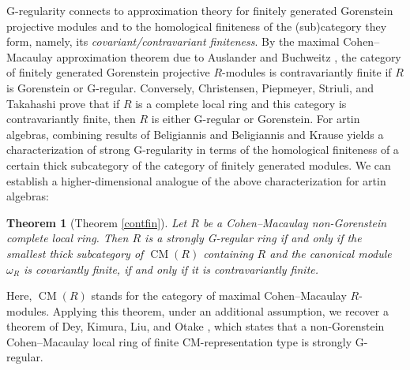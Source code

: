\documentclass{amsart}
\newtheorem{thm}{Theorem}[section]
\theoremstyle{definition}
\theoremstyle{remark}
\numberwithin{equation}{thm}
\def\cm{\operatorname{CM}}
\begin{document}
G-regularity connects to approximation theory for finitely generated Gorenstein projective modules and to the homological finiteness of the (sub)category they form, namely, its {\em covariant/contravariant finiteness}. 
By the maximal Cohen--Macaulay approximation theorem due to Auslander and Buchweitz \cite{AB}, the category of finitely generated Gorenstein projective $R$-modules is contravariantly finite if $R$ is Gorenstein or G-regular. 
Conversely, Christensen, Piepmeyer, Striuli, and Takahashi \cite{CPST08} prove that if $R$ is a complete local ring and this category is contravariantly finite, then $R$ is either G-regular or Gorenstein.
For artin algebras, combining results of Beligiannis \cite{B98} and Beligiannis and Krause \cite{BK} yields a characterization of strong G-regularity in terms of the homological finiteness of a certain thick subcategory of the category of finitely generated modules. 
We can establish a higher-dimensional analogue of the above characterization for artin algebras:

\begin{thm}[Theorem \ref{contfin}]\label{main4}
Let $R$ be a Cohen--Macaulay non-Gorenstein complete local ring.
Then $R$ is a strongly G-regular ring if and only if the smallest thick subcategory of $\cm(R)$ containing $R$ and the canonical module $\omega_R$ is covariantly finite, if and only if it is contravariantly finite.
\end{thm}

\noindent
Here, $\cm(R)$ stands for the category of maximal Cohen--Macaulay $R$-modules.
Applying this theorem, under an additional assumption, we recover a theorem of Dey, Kimura, Liu, and Otake \cite{DKLO25}, which states that a non-Gorenstein Cohen--Macaulay local ring of finite CM-representation type is strongly G-regular.

\end{document}
